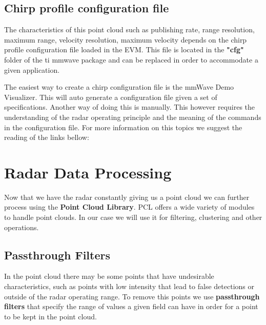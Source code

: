\documentclass[12pt]{article}
\begin{document}
\subsection{Chirp profile configuration file}
The characteristics of this point cloud such as publishing rate, range resolution, maximum range, velocity resolution, maximum velocity depends on the chirp profile configuration file loaded in the EVM. This file is located in the \textbf{"cfg"} folder of the ti mmwave package and can be replaced in order to accommodate a given application.

The easiest way to create a chirp configuration file is the mmWave Demo Visualizer. This will auto generate a configuration file given a set of specifications.
Another way of doing this is manually. This however requires the understanding of the radar operating principle and the meaning of the commands in the configuration file.
For more information on this topics we suggest the reading of the links bellow:

\section{Radar Data Processing}
Now that we have the radar constantly giving us a point cloud we can further process using the \textbf{Point Cloud Library}. PCL offers a wide variety of modules to handle point clouds. In our case we will use it for filtering, clustering and other operations.
\subsection{Passthrough Filters}
In the point cloud there may be some points that have undesirable characteristics, such as points with low intensity  that lead to false detections or outside of the radar operating range. To remove this points we use \textbf{passthrough filters} that specify the range of values a given field can have in order for a point to be kept in the point cloud. 
\end{document}

